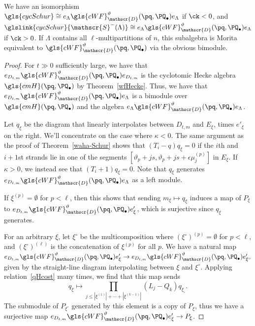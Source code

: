 \begin{prop}\label{cqs-morita}
We have an isomorphism $\gls{cycSchur}\cong e_\Lambda \gls{cWF}^\vartheta_\mathscr{D}
 (\pq,\PQ_{\bullet})e_\Lambda $ if $\ck<0$, and $ \glslink{cycSchur}{\mathscr{S}^-(\Lambda)}\cong e_\Lambda \gls{cWF}^\vartheta_\mathscr{D}
 (\pq,\PQ_{\bullet})e_\Lambda $ if $\ck>0$. If $\Lambda$ contains all
 $\ell$-multipartitions of $n$, this subalgebra is Morita equivalent to $\gls{cWF}^\vartheta_\mathscr{D}
 (\pq,\PQ_{\bullet})$ via the obvious bimodule.
\end{prop}
\begin{proof}
 For $t\gg 0$ sufficiently large, we have that $e_{D_{t,m}}\gls{cWF}^\vartheta_\mathscr{D} (\pq,\PQ_{\bullet}) e_{D_{t,m}}$ is the cyclotomic
 Hecke algebra $\gls{cmH}(\pq,\PQ_\bullet) $ by Theorem~\ref{wfHecke}.
 Thus, we have that $e_{D_{t,m}}\gls{cWF}^\vartheta_\mathscr{D}
 (\pq,\PQ_{\bullet}) e_\Lambda $ is a bimodule over $\gls{cmH}(\pq,\PQ_\bullet)$
 and the algebra $e_\Lambda \gls{cWF}^\vartheta_\mathscr{D}
 (\pq,\PQ_{\bullet})e_\Lambda $. 


Let $q_\xi$ be the diagram that linearly
 interpolates between $D_{t,m}$ and $E_\xi$, times $e'_\xi$ on the
 right. We'll concentrate on the case where $\kappa<0$. The same argument as the proof of Theorem~\ref{waha-Schur}
 shows that $(T_i-q)q_\xi=0$ if the $i$th and $i+1$st strands lie in
 one of the segments $[
\vartheta_p+js,\vartheta_p+js+\epsilon\mu^{(p)}_j]$ in $E_\xi$. If
$\kappa>0$, we instead see that $(T_i+1)q_\xi=0$. Note
that $q_\xi$ generates $e_{D_{t,m}}\gls{cWF}^\vartheta_\mathscr{D}
 (\pq,\PQ_{\bullet}) e_\Lambda $ as a left module.

If $\xi^{(p)}=\emptyset$ for $p<\ell$, then this shows that sending
$m_\xi\mapsto q_\xi$ induces a map of $P_\xi$
to $e_{D_{t,m}}\gls{cWF}^\vartheta_\mathscr{D}
 (\pq,\PQ_{\bullet}) e'_\xi$, which is surjective since $q_{\xi}$
 generates. 

For an arbitrary $\xi$, let $\xi^\circ$ be the multicomposition where
$(\xi^\circ)^{(p)}=\emptyset$ for $p<\ell$, and $(\xi^\circ)^{(\ell)}$
is the concatenation of $\xi^{(p)}$ for all $p$. We have a natural
map $e_{D_{t,m}}\gls{cWF}^\vartheta_\mathscr{D}
 (\pq,\PQ_{\bullet}) e'_\xi\to e_{D_{t,m}}\gls{cWF}^\vartheta_\mathscr{D}
 (\pq,\PQ_{\bullet}) e'_{\xi^\circ}$ given by the straight-line
 diagram interpolating between $\xi$ and $\xi^\circ$. Applying
 relation~\eqref{qHcost} many times, we find that this map sends
 \[q_{\xi}\mapsto\prod_{j\leq|\xi^{(1)}|+\cdots +|\xi^{(k-1)}|}
 (L_j-Q_k)q_{\xi_\circ}.\] The submodule of $P_{\xi^\circ}$
 generated by this element is a copy of $P_{\xi}$, thus we have a
 surjective map $e_{D_{t,m}}\gls{cWF}^\vartheta_\mathscr{D}
 (\pq,\PQ_{\bullet}) e'_\xi\to P_{\xi}$. 



\end{proof}
